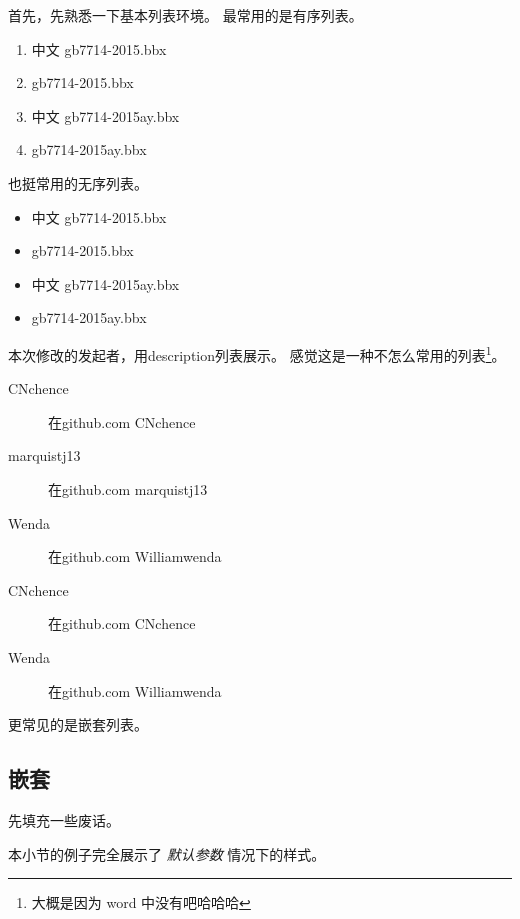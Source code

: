 \documentclass[../Main/thesis]{subfiles}
\begin{document}
首先，先熟悉一下基本列表环境。
最常用的是有序列表。

\begin{enumerate}
  \item 中文 gb7714-2015.bbx
  \item gb7714-2015.bbx
  \item 中文 gb7714-2015ay.bbx
  \item gb7714-2015ay.bbx
\end{enumerate}

也挺常用的无序列表。

\begin{itemize}
  \item 中文 gb7714-2015.bbx
  \item gb7714-2015.bbx
  \item 中文 gb7714-2015ay.bbx
  \item gb7714-2015ay.bbx
\end{itemize}

本次修改的发起者，用description列表展示。
感觉这是一种不怎么常用的列表\footnote{大概是因为 word 中没有吧哈哈哈}。

\begin{description}
  \item[CNchence] 在github.com CNchence
  \item[marquistj13] 在github.com marquistj13
  \item[Wenda] 在github.com Williamwenda
  \item[CNchence] 在github.com CNchence
  \item[Wenda] 在github.com Williamwenda
\end{description}

更常见的是嵌套列表。

\subsection{嵌套}

先填充一些废话。\zhlipsum[6]

本小节的例子完全展示了 \emph{默认参数} 情况下的样式。
\end{document}
